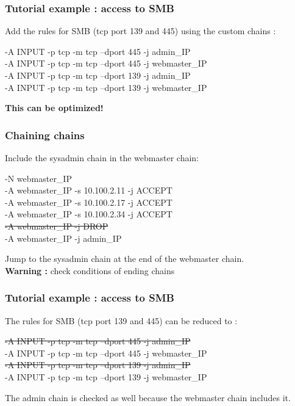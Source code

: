 \documentclass[14pt]{beamer}
\begin{document}
  \begin{frame}
    \frametitle{Tutorial example : access to SMB}
    Add the rules for SMB (tcp port 139 and 445) using the custom chains :
    \begin{example}
      \small{-A INPUT -p tcp -m tcp --dport 445 -j admin\_IP\\
      -A INPUT -p tcp -m tcp --dport 445 -j webmaster\_IP\\
      -A INPUT -p tcp -m tcp --dport 139 -j admin\_IP\\
      -A INPUT -p tcp -m tcp --dport 139 -j webmaster\_IP}
    \end{example}
  \pause
  \textbf{This can be optimized!}
  \end{frame}
  \begin{frame}
    \frametitle{Chaining chains}
    Include the sysadmin chain in the webmaster chain:
    \begin{example}
      \small{-N webmaster\_IP\\
      -A webmaster\_IP -s 10.100.2.11 -j ACCEPT\\
      -A webmaster\_IP -s 10.100.2.17 -j ACCEPT\\
      -A webmaster\_IP -s 10.100.2.34 -j ACCEPT\\
      \sout{-A webmaster\_IP -j DROP}\\
      -A webmaster\_IP -j admin\_IP}
    \end{example}
    Jump to the sysadmin chain at the end of the webmaster chain.\\
    \textbf{Warning :} check conditions of ending chains
  \end{frame}
  \begin{frame}
    \frametitle{Tutorial example : access to SMB}
    The rules for SMB (tcp port 139 and 445) can be reduced to :
    \begin{example}
      \small{\sout{-A INPUT -p tcp -m tcp --dport 445 -j admin\_IP}\\
      -A INPUT -p tcp -m tcp --dport 445 -j webmaster\_IP\\
      \sout{-A INPUT -p tcp -m tcp --dport 139 -j admin\_IP}\\
      -A INPUT -p tcp -m tcp --dport 139 -j webmaster\_IP}
    \end{example}
  The admin chain is checked as well because the webmaster chain includes it.
  \end{frame}
\end{document}

